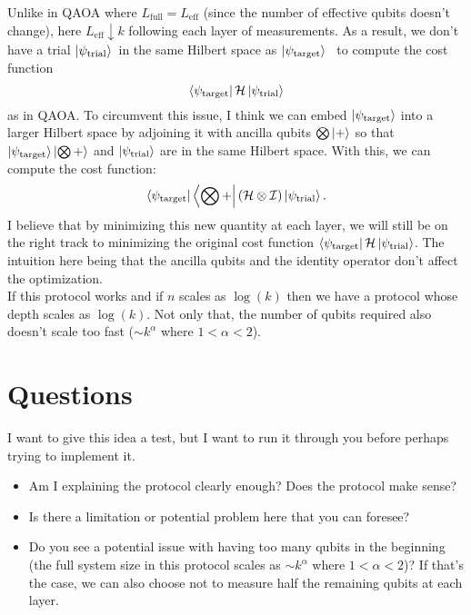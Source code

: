 \documentclass{article}
\theoremstyle{definition}
\newcommand{\had}{\mathcal{H}}
\newcommand{\al}{\alpha}
\newcommand{\Id}{\mathcal{I}}
\begin{document}
\noindent Unlike in QAOA where $L_{\text{full}} = L_{\text{eff}}$ (since the number of effective qubits doesn't change), here $L_{\text{eff}} \downarrow k$ following each layer of measurements. As a result, we don't have a trial $\ket{\psi_{\text{trial}}}$ in the same Hilbert space as $\ket{\psi_{\text{target}}}$  to compute the cost function
\begin{equation*}
\bra{\psi_{\text{target}}} \had \ket{\psi_{\text{trial}}}
\end{equation*}
as in QAOA. To circumvent this issue, I think we can embed $\ket{\psi_{\text{target}}}$ into a larger Hilbert space by adjoining it with ancilla qubits $\bigotimes \ket{+}$ so that $\ket{\psi_{\text{target}}}\ket{\bigotimes+}$ and $\ket{\psi_{\text{trial}}}$ are in the same Hilbert space. With this, we can compute the cost function:
\begin{equation*}
\bra{\psi_{\text{target}}} \bra{\bigotimes +} (\had \otimes \Id) \ket{\psi_{\text{trial}}}.
\end{equation*}
\noindent I believe that by minimizing this new quantity at each layer, we will still be on the right track to minimizing the original cost function  $\bra{\psi_{\text{target}}} \had \ket{\psi_{\text{trial}}}$. The intuition here being that the ancilla qubits and the identity operator don't affect the optimization.\\


\noindent If this protocol works and if $n$ scales as $\log(k)$ then we have a protocol whose depth scales as $\log(k)$. Not only that, the number of qubits required also doesn't scale too fast ($\sim k^{\al}$ where $1 < \al < 2$).


\section{Questions} 

I want to give this idea a test, but I want to run it through you before perhaps trying to implement it. 

\begin{itemize}
	\item Am I explaining the protocol clearly enough? Does the protocol make sense?  
	\item Is there a limitation or potential problem here that you can foresee? 
	\item Do you see a potential issue with having too many qubits in the beginning (the full system size in this protocol scales as $\sim k^\al$ where $1 < \al < 2$)? If that's the case, we can also choose not to measure half the remaining qubits at each layer.
\end{itemize}

	
	
	
	
	
	
	
	
	
	
	
\end{document}
